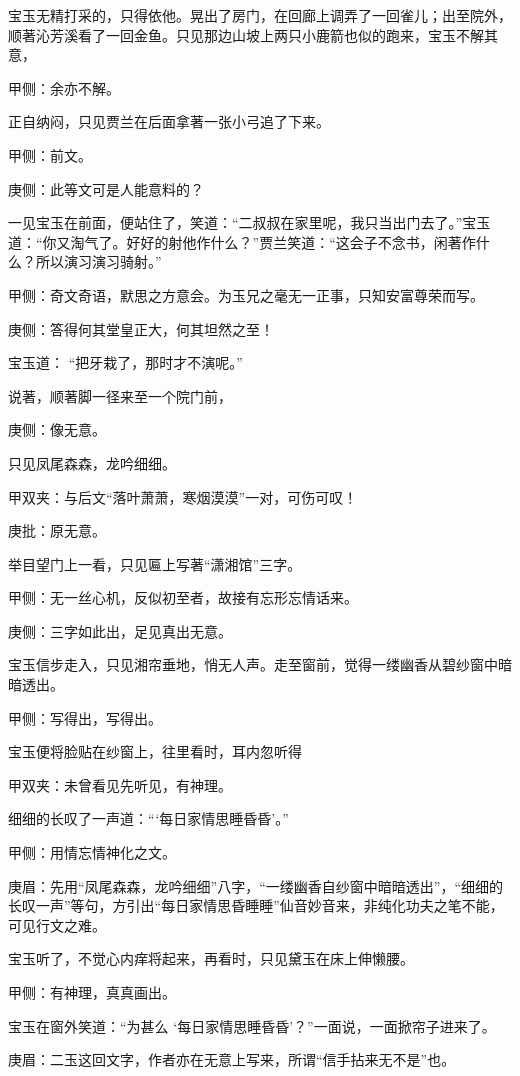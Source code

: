 \begin{parag}
    宝玉无精打采的，只得依他。晃出了房门，在回廊上调弄了一回雀儿；出至院外，顺著沁芳溪看了一回金鱼。只见那边山坡上两只小鹿箭也似的跑来，宝玉不解其意，\begin{note}甲侧：余亦不解。\end{note}正自纳闷，只见贾兰在后面拿著一张小弓追了下来。\begin{note}甲侧：前文。\end{note}\begin{note}庚侧：此等文可是人能意料的？\end{note}一见宝玉在前面，便站住了，笑道：“二叔叔在家里呢，我只当出门去了。”宝玉道：“你又淘气了。好好的射他作什么？”贾兰笑道：“这会子不念书，闲著作什么？所以演习演习骑射。”\begin{note}甲侧：奇文奇语，默思之方意会。为玉兄之毫无一正事，只知安富尊荣而写。\end{note}\begin{note}庚侧：答得何其堂皇正大，何其坦然之至！\end{note}宝玉道： “把牙栽了，那时才不演呢。”
\end{parag}


\begin{parag}
    说著，顺著脚一径来至一个院门前，\begin{note}庚侧：像无意。\end{note}只见凤尾森森，龙吟细细。\begin{note}甲双夹：与后文“落叶萧萧，寒烟漠漠”一对，可伤可叹！\end{note}\begin{note}庚批：原无意。\end{note}举目望门上一看，只见匾上写著“潇湘馆”三字。\begin{note}甲侧：无一丝心机，反似初至者，故接有忘形忘情话来。\end{note}\begin{note}庚侧：三字如此出，足见真出无意。\end{note}宝玉信步走入，只见湘帘垂地，悄无人声。走至窗前，觉得一缕幽香从碧纱窗中暗暗透出。\begin{note}甲侧：写得出，写得出。\end{note}宝玉便将脸贴在纱窗上，往里看时，耳内忽听得\begin{note}甲双夹：未曾看见先听见，有神理。\end{note}细细的长叹了一声道：“‘每日家情思睡昏昏’。”\begin{note}甲侧：用情忘情神化之文。\end{note}\begin{note}庚眉：先用“凤尾森森，龙吟细细”八字，“一缕幽香自纱窗中暗暗透出”，“细细的长叹一声”等句，方引出“每日家情思昏睡睡”仙音妙音来，非纯化功夫之笔不能，可见行文之难。\end{note}宝玉听了，不觉心内痒将起来，再看时，只见黛玉在床上伸懒腰。\begin{note}甲侧：有神理，真真画出。\end{note}宝玉在窗外笑道：“为甚么 ‘每日家情思睡昏昏’？”一面说，一面掀帘子进来了。\begin{note}庚眉：二玉这回文字，作者亦在无意上写来，所谓“信手拈来无不是”也。\end{note}
\end{parag}


